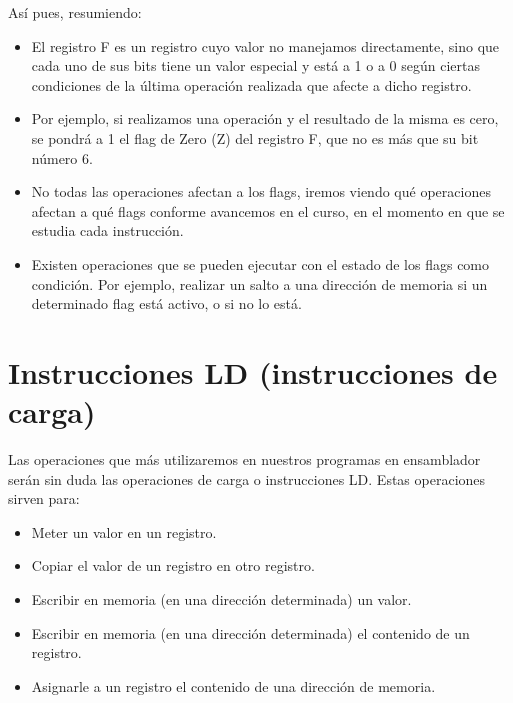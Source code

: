 \documentclass[letterpaper,10pt,spanish]{sphinxmanual}
\begin{document}
Así pues, resumiendo:
\begin{itemize}
\item {} 
El registro F es un registro cuyo valor no manejamos directamente, sino que cada uno de sus bits tiene un valor especial y está a 1 o a 0 según ciertas condiciones de la última operación realizada que afecte a dicho registro.

\item {} 
Por ejemplo, si realizamos una operación y el resultado de la misma es cero, se pondrá a 1 el flag de Zero (Z) del registro F, que no es más que su bit número 6.

\item {} 
No todas las operaciones afectan a los flags, iremos viendo qué operaciones afectan a qué flags conforme avancemos en el curso, en el momento en que se estudia cada instrucción.

\item {} 
Existen operaciones que se pueden ejecutar con el estado de los flags como condición. Por ejemplo, realizar un salto a una dirección de memoria si un determinado flag está activo, o si no lo está.

\end{itemize}


\section{Instrucciones LD (instrucciones de carga)}
\label{\detokenize{04_lenguaje_ensamblador_01/lenguaje_ensamblador_01:instrucciones-ld-instrucciones-de-carga}}
Las operaciones que más utilizaremos en nuestros programas en ensamblador serán sin duda las operaciones de carga o instrucciones LD. Estas operaciones sirven para:
\begin{itemize}
\item {} 
Meter un valor en un registro.

\item {} 
Copiar el valor de un registro en otro registro.

\item {} 
Escribir en memoria (en una dirección determinada) un valor.

\item {} 
Escribir en memoria (en una dirección determinada) el contenido de un registro.

\item {} 
Asignarle a un registro el contenido de una dirección de memoria.

\end{itemize}
\end{document}
